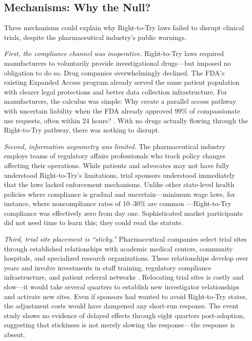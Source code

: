 \documentclass[12pt]{article}
\begin{document}
\subsection{Mechanisms: Why the Null?}

Three mechanisms could explain why Right-to-Try laws failed to disrupt clinical trials, despite the pharmaceutical industry's public warnings.

\textit{First, the compliance channel was inoperative.} Right-to-Try laws required manufacturers to voluntarily provide investigational drugs---but imposed no obligation to do so. Drug companies overwhelmingly declined. The FDA's existing Expanded Access program already served the same patient population with clearer legal protections and better data collection infrastructure. For manufacturers, the calculus was simple: Why create a parallel access pathway with uncertain liability when the FDA already approved 99\% of compassionate use requests, often within 24 hours? \citep{darrow2018practical}. With no drugs actually flowing through the Right-to-Try pathway, there was nothing to disrupt.

\textit{Second, information asymmetry was limited.} The pharmaceutical industry employs teams of regulatory affairs professionals who track policy changes affecting their operations. While patients and advocates may not have fully understood Right-to-Try's limitations, trial sponsors understood immediately that the laws lacked enforcement mechanisms. Unlike other state-level health policies where compliance is gradual and uncertain---minimum wage laws, for instance, where noncompliance rates of 10--30\% are common \citep{harasztosi2019pays}---Right-to-Try compliance was effectively zero from day one. Sophisticated market participants did not need time to learn this; they could read the statute.

\textit{Third, trial site placement is ``sticky.''} Pharmaceutical companies select trial sites through established relationships with academic medical centers, community hospitals, and specialized research organizations. These relationships develop over years and involve investments in staff training, regulatory compliance infrastructure, and patient referral networks \citep{thiers2008trends}. Relocating trial sites is costly and slow---it would take several quarters to establish new investigator relationships and activate new sites. Even if sponsors had wanted to avoid Right-to-Try states, the adjustment costs would have dampened any short-run response. The event study shows no evidence of delayed effects through eight quarters post-adoption, suggesting that stickiness is not merely slowing the response---the response is absent.
\end{document}
